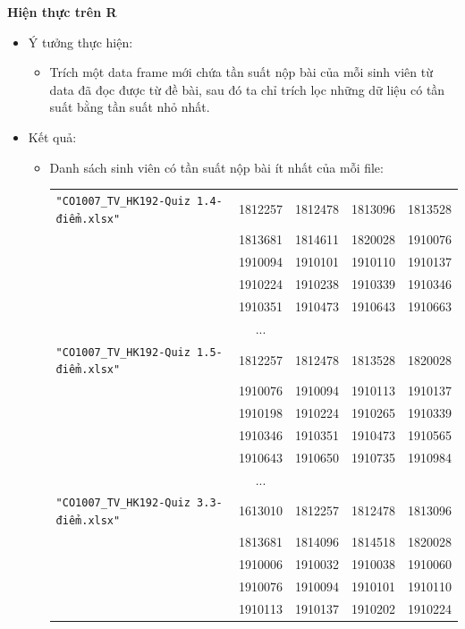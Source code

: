 \documentclass[a4paper]{article}
\theoremstyle{definition}
\begin{document}
\begin{enumerate}[a)]
\begin{itemize}
\begin{itemize}
        \end{itemize}
    \end{itemize}
    \bf Hiện thực trên R\normalfont
    \begin{itemize}
        \item Ý tưởng thực hiện:
        \begin{itemize}
            \item Trích một data frame mới chứa tần suất nộp bài của mỗi sinh viên từ data đã đọc được từ đề bài, sau đó ta chỉ trích lọc những dữ liệu có tần suất bằng tần suất nhỏ nhất.
        \end{itemize}
        \item Kết quả:
        \begin{itemize}
            \item Danh sách sinh viên có tần suất nộp bài ít nhất của mỗi file:
            \begin{center}
                \begin{tabular}{l c c c c}
                     \texttt{"CO1007\_TV\_HK192-Quiz 1.4-điểm.xlsx"} & 1812257 & 1812478 & 1813096 & 1813528 \\ & 1813681 & 1814611 & 1820028 & 1910076 \\ & 1910094 & 1910101 & 1910110 & 1910137 \\ & 1910224 & 1910238 & 1910339 & 1910346 \\ & 1910351 & 1910473 & 1910643 & 1910663\\
                     & ...\\
                     \texttt{"CO1007\_TV\_HK192-Quiz 1.5-điểm.xlsx"} &
                     1812257 & 1812478 & 1813528 & 1820028 \\ & 1910076 & 1910094 & 1910113 & 1910137 \\ & 1910198 & 1910224 & 1910265 & 1910339 \\ & 1910346 & 1910351 & 1910473 & 1910565 \\ & 1910643 & 1910650 & 1910735 & 1910984\\
                     & ...\\
                     \texttt{"CO1007\_TV\_HK192-Quiz 3.3-điểm.xlsx"} & 1613010 & 1812257 & 1812478 & 1813096 \\ & 1813681 & 1814096 & 1814518 & 1820028 \\ & 1910006 & 1910032 & 1910038 & 1910060 \\ & 1910076 & 1910094 & 1910101 & 1910110 \\ & 1910113 & 1910137 & 1910202 & 1910224\\

\end{tabular}
\end{center}
\end{itemize}
\end{itemize}
\end{enumerate}
\end{document}
